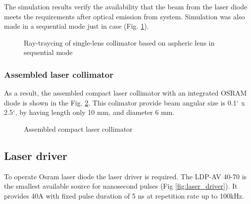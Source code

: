 The simulation results verify the availability that the beam from the laser diode meets the requirements after optical emission from system.
Simulation was also made in a sequential mode just in case (Fig. \ref{fig:ld_sequential}).


\begin{figure}[h]
\caption{Ray-traycing of single-lens collimator based on aspheric lens in sequential mode}
\label{fig:ld_sequential} 
\end{figure}

\subsubsection{Assembled laser collimator}
As a result, the assembled compact laser collimator with an integrated OSRAM diode is shown in the Fig. \ref{fig:ld_assembled}.
This colimator provide beam angular size is 0.1$^\circ$ x 2.5$^\circ$, by having length only 10 mm, and diameter 6 mm.

\begin{figure}[h]
\center{\texttt{[image: ld]}}
\caption{Assembled compact laser collimator}
\label{fig:ld_assembled} 
\end{figure}



\subsection{Laser driver}


To operate Osram laser diode the laser driver is required.
The LDP-AV 40-70 is the smallest available source for nanosecond pulses (Fig \ref{fig:laser_driver}).
It provides 40A with fixed pulse duration of 5 ns at repetition rate up to 100kHz.

\begin{figure}[H]
\end{figure}

